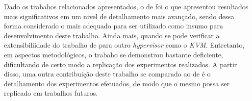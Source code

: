 Dado os trabahos relacionados apresentados, o de  foi o que apresentou resultados mais significativos em um nivel de detalhamento mais avançado, sendo dessa forma considerado o mais adequado para ser utilizado como insumo para desenvolvimento deste trabalho. Ainda mais, quando se pode verificar a extensibiliidade do trabalho de  para outro \textit{hypervisor} como o \textit{KVM}. Entretanto, em aspectos metodológicos, o trabaho se demonstrou bastante deficiente, dificultando de certo modo a replicação dos experimentos realizados. A partir disso, uma outra contribuição deste trabalho se comparado ao de  é o detalhamento dos experimentos efetuados, de modo que o mesmo possa ser replicado em trabalhos futuros.


 

    

